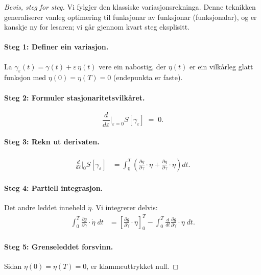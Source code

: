 \begin{proof}[Bevis, steg for steg]
Vi fylgjer den klassiske variasjonsrekninga. Denne teknikken
generaliserer vanleg optimering til funksjonar av funksjonar
(funksjonalar), og er kanskje ny for lesaren; vi går gjennom
kvart steg eksplisitt.

\paragraph{Steg 1: Definer ein variasjon.}
La $\gamma_\varepsilon(t) = \gamma(t) + \varepsilon \, \eta(t)$
vere ein nabostig, der $\eta(t)$ er ein vilkårleg glatt funksjon
med $\eta(0) = \eta(T) = 0$ (endepunkta er faste).

\paragraph{Steg 2: Formuler stasjonaritetsvilkåret.}
\[
  \frac{d}{d\varepsilon}\bigg|_{\varepsilon=0}
  S[\gamma_\varepsilon] \;=\; 0.
\]

\paragraph{Steg 3: Rekn ut derivaten.}
\begin{align*}
  \frac{d}{d\varepsilon}\bigg|_{0} S[\gamma_\varepsilon]
  &= \int_0^T \!\left(
    \frac{\partial g}{\partial \gamma} \cdot \eta
    + \frac{\partial g}{\partial \dot{\gamma}} \cdot \dot{\eta}
  \right) dt.
\end{align*}

\paragraph{Steg 4: Partiell integrasjon.}
Det andre leddet inneheld $\dot{\eta}$. Vi integrerer delvis:
\begin{align*}
  \int_0^T \frac{\partial g}{\partial \dot{\gamma}}
    \cdot \dot{\eta}\; dt
  &= \left[\frac{\partial g}{\partial \dot{\gamma}}
    \cdot \eta \right]_0^T
    - \int_0^T \frac{d}{dt}
      \frac{\partial g}{\partial \dot{\gamma}}
      \cdot \eta \; dt.
\end{align*}

\paragraph{Steg 5: Grenseleddet forsvinn.}
Sidan $\eta(0) = \eta(T) = 0$, er klammeuttrykket null.


\end{proof}
